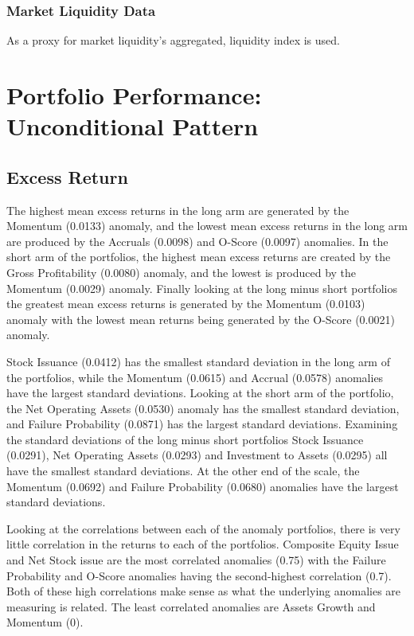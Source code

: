 \documentclass[a4paper]{article}                 %
\begin{document}
\subsubsection{Market Liquidity Data}
As a proxy for market liquidity\cite{pastor2003liquidity}'s aggregated, liquidity index is used. 


\section{Portfolio Performance: Unconditional Pattern}
\subsection{Excess Return }
The highest mean excess returns in the long arm are generated by the Momentum (0.0133) anomaly, and the lowest mean excess returns in the long arm are produced by the Accruals (0.0098) and O-Score (0.0097) anomalies. In the short arm of the portfolios, the highest mean excess returns are created by the Gross Profitability (0.0080) anomaly, and the lowest is produced by the Momentum (0.0029) anomaly. Finally looking at the long minus short portfolios the greatest mean excess returns is generated by the Momentum (0.0103) anomaly with the lowest mean returns being generated by the O-Score (0.0021) anomaly.

Stock Issuance (0.0412) has the smallest standard deviation in the long arm of the portfolios, while the Momentum (0.0615) and Accrual (0.0578) anomalies have the largest standard deviations. Looking at the short arm of the portfolio, the Net Operating Assets (0.0530) anomaly has the smallest standard deviation, and Failure Probability (0.0871) has the largest standard deviations. Examining the standard deviations of the long minus short portfolios Stock Issuance (0.0291), Net Operating Assets (0.0293) and Investment to Assets (0.0295) all have the smallest standard deviations. At the other end of the scale, the Momentum (0.0692) and Failure Probability (0.0680) anomalies have the largest standard deviations.

Looking at the correlations between each of the anomaly portfolios, there is very little correlation in the returns to each of the portfolios. Composite Equity Issue and Net Stock issue are the most correlated anomalies (0.75) with the Failure Probability and O-Score anomalies having the second-highest correlation (0.7). Both of these high correlations make sense as what the underlying anomalies are measuring is related. The least correlated anomalies are Assets Growth and Momentum (0).
\end{document}
